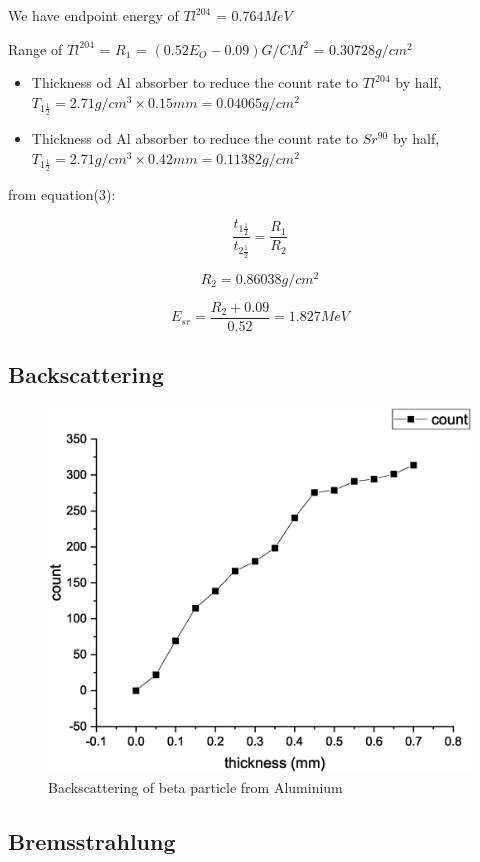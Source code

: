 		We have endpoint energy of $Tl^{204}$ = $0.764MeV$

		Range of $Tl^{204}$ = $R_1$ = $(0.52E_O-0.09)G/CM^2$ = $0.30728g/cm^2$
		\begin{itemize}
			\item Thickness od Al absorber to reduce the count rate to $Tl^{204}$ by half, $T_{1\frac{1}{2}}=2.71g/cm^3\times0.15mm=0.04065g/cm^2$
			\item Thickness od Al absorber to reduce the count rate to $Sr^{90}$ by half, $T_{1\frac{1}{2}}=2.71g/cm^3\times0.42mm=0.11382g/cm^2$
		\end{itemize}

		from equation(3):

		$$\frac{t_{1\frac{1}{2}}}{t_{2\frac{1}{2}}}=\frac{R_1}{R_2}$$

		$$R_2=0.86038g/cm^2$$

		$$E_{sr}=\frac{R_2+0.09}{0.52}=1.827MeV$$

	\subsection{Backscattering}
	

		\begin{figure}[H]
			\centering
			\includegraphics[width=0.72\columnwidth]{images/gm3.eps}
			\caption{Backscattering of beta particle from Aluminium}
			\label{graph:3}
		\end{figure}
		\subsection{Bremsstrahlung}

	

	

